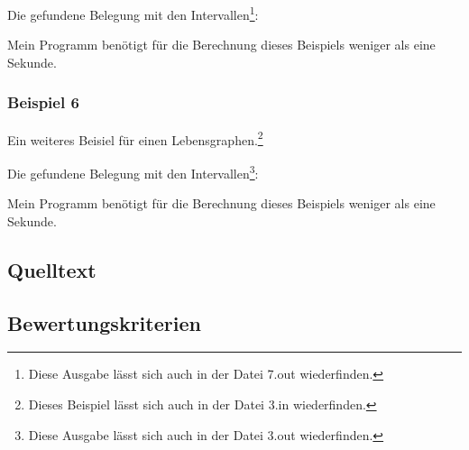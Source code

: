 {\small

}

Die gefundene Belegung mit den Intervallen\footnote{Diese Ausgabe lässt sich auch in der Datei 7.out wiederfinden.}:

{\small

}

Mein Programm benötigt für die Berechnung dieses Beispiels weniger als eine Sekunde.

\subsubsection*{Beispiel 6}
Ein weiteres Beisiel für einen Lebensgraphen.\footnote{Dieses Beispiel lässt sich auch in der Datei 3.in wiederfinden.}

{\small

}

Die gefundene Belegung mit den Intervallen\footnote{Diese Ausgabe lässt sich auch in der Datei 3.out wiederfinden.}:

{\small

}

Mein Programm benötigt für die Berechnung dieses Beispiels weniger als eine Sekunde.


\subsection{Quelltext}

{\small

}

\subsection{Bewertungskriterien}

